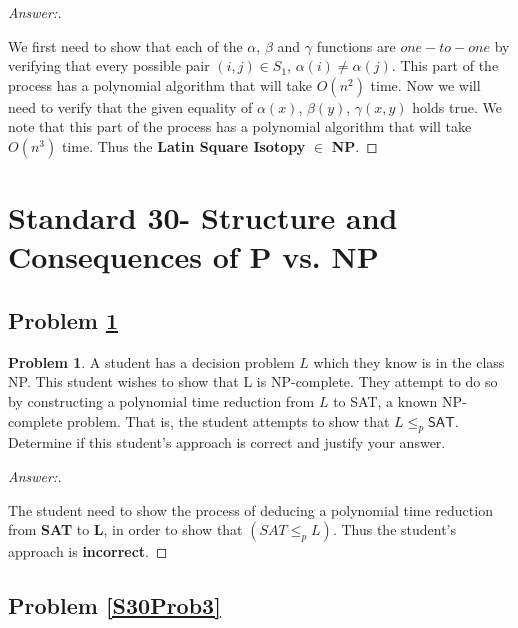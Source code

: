 \documentclass[11pt]{article}
\theoremstyle{definition}
\theoremstyle{definition}
\newtheorem{required}{Problem}
\theoremstyle{definition}
\begin{document}
\begin{proof}[Answer:] \
\item We first need to show that each of the $\alpha$, $\beta$ and $\gamma$ functions are $one-to-one$ by verifying that every possible pair $(i,j) \in S_1$, $\alpha(i) \neq \alpha(j)$. This part of the process has a polynomial algorithm that will take $O(n^{2})$ time. Now we will need to verify that the given equality of $\alpha(x)$, $\beta(y)$, $\gamma(x,y)$ holds true. We note that this part of the process has a polynomial algorithm that will take $O(n^{3})$ time. Thus the \textbf{Latin Square Isotopy} $\in$ \textbf{NP}.


\end{proof}


\newpage
\section{Standard 30- Structure and Consequences of \textsf{P} vs. \textsf{NP}}

\subsection{Problem \ref{S30Prob1}}
\begin{required} \label{S30Prob1}
A student has a decision problem $L$ which they know is in the class \textsf{NP}. This student wishes to show that L is \textsf{NP}-complete. They attempt to do so by constructing a polynomial time reduction from $L$ to \textsf{SAT}, a known \textsf{NP}-complete problem. That is, the student attempts to show that $L \leq_{p} \textsf{SAT}.$ Determine if this student’s approach is correct and justify your answer.
\end{required}

\begin{proof}[Answer:] \
\item The student need to show the process of deducing a polynomial time reduction from \textbf{SAT} to \textbf{L}, in order to show that $(SAT \leq_p L)$. Thus the student's approach is \textbf{incorrect}.
\end{proof}



\newpage
\subsection{Problem \ref{S30Prob3}}
\end{document}
